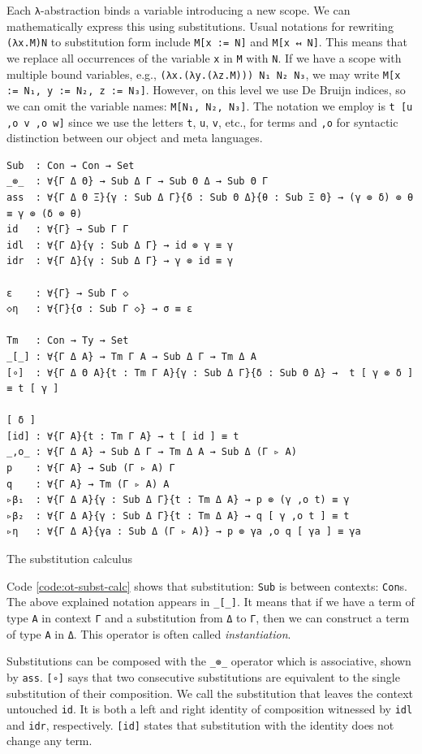 Each \verb$λ$-abstraction binds a variable introducing a new scope. We can mathematically express this using substitutions. Usual notations for rewriting \verb$(λx.M)N$ to substitution form include \verb$M[x := N]$ and \verb$M[x ↤ N]$. This means that we replace all occurrences of the variable \verb$x$ in \verb$M$ with \verb$N$. If we have a scope with multiple bound variables, e.g., \verb$(λx.(λy.(λz.M))) N₁ N₂ N₃$, we may write \verb$M[x := N₁, y := N₂, z := N₃]$. However, on this level we use De Bruijn indices, so we can omit the variable names: \verb$M[N₁, N₂, N₃]$. The notation we employ is \verb$t [u ,o v ,o w]$ since we use the letters \verb$t$, \verb$u$, \verb$v$, etc., for terms and \verb$,o$ for syntactic distinction between our object and meta languages.

\begin{listing}[H]
\begin{verbatim}
Sub  : Con → Con → Set
_⊚_  : ∀{Γ Δ Θ} → Sub Δ Γ → Sub Θ Δ → Sub Θ Γ
ass  : ∀{Γ Δ Θ Ξ}{γ : Sub Δ Γ}{δ : Sub Θ Δ}{θ : Sub Ξ Θ} → (γ ⊚ δ) ⊚ θ ≡ γ ⊚ (δ ⊚ θ)
id   : ∀{Γ} → Sub Γ Γ
idl  : ∀{Γ Δ}{γ : Sub Δ Γ} → id ⊚ γ ≡ γ
idr  : ∀{Γ Δ}{γ : Sub Δ Γ} → γ ⊚ id ≡ γ

ε    : ∀{Γ} → Sub Γ ◇
◇η   : ∀{Γ}{σ : Sub Γ ◇} → σ ≡ ε

Tm   : Con → Ty → Set
_[_] : ∀{Γ Δ A} → Tm Γ A → Sub Δ Γ → Tm Δ A
[∘]  : ∀{Γ Δ Θ A}{t : Tm Γ A}{γ : Sub Δ Γ}{δ : Sub Θ Δ} →  t [ γ ⊚ δ ] ≡ t [ γ ]
                                                                           [ δ ]
[id] : ∀{Γ A}{t : Tm Γ A} → t [ id ] ≡ t
_,o_ : ∀{Γ Δ A} → Sub Δ Γ → Tm Δ A → Sub Δ (Γ ▹ A)
p    : ∀{Γ A} → Sub (Γ ▹ A) Γ
q    : ∀{Γ A} → Tm (Γ ▹ A) A
▹β₁  : ∀{Γ Δ A}{γ : Sub Δ Γ}{t : Tm Δ A} → p ⊚ (γ ,o t) ≡ γ
▹β₂  : ∀{Γ Δ A}{γ : Sub Δ Γ}{t : Tm Δ A} → q [ γ ,o t ] ≡ t
▹η   : ∀{Γ Δ A}{γa : Sub Δ (Γ ▹ A)} → p ⊚ γa ,o q [ γa ] ≡ γa
\end{verbatim}
\caption{The substitution calculus}
\label{code:ot-subst-calc}
\end{listing}

Code \ref{code:ot-subst-calc} shows that substitution: \verb$Sub$ is between contexts: \verb$Con$s. The above explained notation appears in \verb$_[_]$. It means that if we have a term of type \verb$A$ in context \verb$Γ$ and a substitution from \verb$Δ$ to \verb$Γ$, then we can construct a term of type \verb$A$ in \verb$Δ$. This operator is often called \textit{instantiation}.

Substitutions can be composed with the \verb$_⊚_$ operator which is associative, shown by \verb$ass$. \verb$[∘]$ says that two consecutive substitutions are equivalent to the single substitution of their composition. We call the substitution that leaves the context untouched \verb$id$. It is both a left and right identity of composition witnessed by \verb$idl$ and \verb$idr$, respectively. \verb$[id]$ states that substitution with the identity does not change any term.

